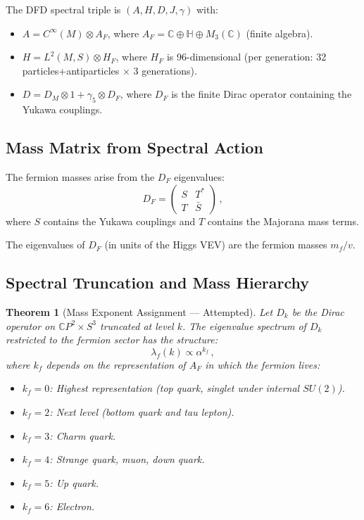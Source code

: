 \documentclass[11pt,a4paper]{article}
\newtheorem{theorem}{Theorem}
\newcommand{\CP}{\mathbb{C}P}
\begin{document}
The DFD spectral triple is $(A, H, D, J, \gamma)$ with:
\begin{itemize}
\item $A = C^\infty(M) \otimes A_F$, where $A_F = \mathbb{C} \oplus \mathbb{H} \oplus M_3(\mathbb{C})$ (finite algebra).
\item $H = L^2(M, S) \otimes H_F$, where $H_F$ is 96-dimensional (per generation: 32 particles+antiparticles $\times$ 3 generations).
\item $D = D_M \otimes 1 + \gamma_5 \otimes D_F$, where $D_F$ is the finite Dirac operator containing the Yukawa couplings.
\end{itemize}

\subsection{Mass Matrix from Spectral Action}

The fermion masses arise from the $D_F$ eigenvalues:
\begin{equation}
D_F = \begin{pmatrix} S & T^* \\ T & \bar{S} \end{pmatrix}\,,
\end{equation}
where $S$ contains the Yukawa couplings and $T$ contains the Majorana mass terms.

The eigenvalues of $D_F$ (in units of the Higgs VEV) are the fermion masses $m_f/v$.

\subsection{Spectral Truncation and Mass Hierarchy}

\begin{theorem}[Mass Exponent Assignment --- Attempted]
Let $D_k$ be the Dirac operator on $\CP^2 \times S^3$ truncated at level $k$. The eigenvalue spectrum of $D_k$ restricted to the fermion sector has the structure:
\begin{equation}
\lambda_f(k) \propto \alpha^{k_f}\,,
\end{equation}
where $k_f$ depends on the representation of $A_F$ in which the fermion lives:
\begin{itemize}
\item $k_f = 0$: Highest representation (top quark, singlet under internal $SU(2)$).
\item $k_f = 2$: Next level (bottom quark and tau lepton).
\item $k_f = 3$: Charm quark.
\item $k_f = 4$: Strange quark, muon, down quark.
\item $k_f = 5$: Up quark.
\item $k_f = 6$: Electron.
\end{itemize}
\end{theorem}
\end{document}
